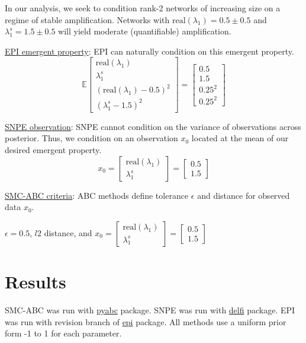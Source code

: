 \documentclass[11pt]{article}
\begin{document}
In our analysis, we seek to condition rank-2 networks of increasing size on a regime of stable amplification.  
Networks with $\text{real}(\lambda_1) = 0.5 \pm 0.5$ and $\lambda_1^s = 1.5 \pm 0.5$ will yield moderate (quantifiable) amplification.

\underline{EPI emergent property}: EPI can naturally condition on this emergent property.
\[\mathbb{E}\begin{bmatrix} \text{real}(\lambda_1) \\ \lambda^s_1 \\ (\text{real}(\lambda_1)-0.5)^2 \\ (\lambda^s_1 -1.5)^2  \end{bmatrix} = \begin{bmatrix} 0.5 \\ 1.5 \\ 0.25^2 \\ 0.25^2 \end{bmatrix}\]

\underline{SNPE observation}: SNPE cannot condition on the variance of observations across posterior.  Thus, we condition on an observation $x_0$ located at the mean of our desired emergent property.
\[x_0 = \begin{bmatrix} \text{real}(\lambda_1) \\ \lambda^s_1 \end{bmatrix} = \begin{bmatrix} 0.5 \\ 1.5 \end{bmatrix} \]

\underline{SMC-ABC criteria}: ABC methods define tolerance $\epsilon$ and distance for observed data $x_0$.\\
\begin{center}
$\epsilon = 0.5$, $l2$ distance, and  $x_0 = \begin{bmatrix} \text{real}(\lambda_1) \\ \lambda^s_1 \end{bmatrix} = \begin{bmatrix} 0.5 \\ 1.5 \end{bmatrix}$
\end{center}

\clearpage

\section{Results}
SMC-ABC was run with \href{https://pyabc.readthedocs.io/en/latest/index.html}{pyabc} package.  SNPE was run with \href{http://www.mackelab.org/delfi/}{delfi} package.  EPI was run with revision branch of \href{https://github.com/cunningham-lab/epi/tree/revision}{epi} package.  All methods use a uniform prior form -1 to 1 for each parameter.
\end{document}
